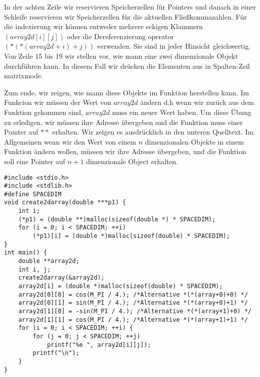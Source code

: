 In der achten Zeile wir reservieren Speicherzellen für Pointers
und danach in einer Schleife reservieren wir Speicherzellen für
die aktuellen Fließkommazahlen. Für die indexierung wir können
entweder mehrere eckigen Klammern $(array2d[i][j])$ oder
die Dereferenzierung operator $(*(*(array2d+i)+j))$ verwenden.
Sie sind in jeder Hinsicht gleichwertig. Von Zeile 15 bis 19 
wir stellen vor, wie mann eine zwei dimenzionale Objekt
durchführen kann. In diesem Fall wir 
drücken die Elementen aus in Spalten-Zeil matrixmode.

Zum ende, wir zeigen, wie mann diese Objekte im Funktion herstellen kann.
Im Funkcion wir müssen der Wert von $array2d$ ändern d.h wenn wir zurück
aus dem Funktion gekommen sind, $array2d$ muss ein neuer Wert haben.
Um diese Übung zu erledigen, wir müssen ihre Adresse übergeben und
die Funktion muss einer Pointer auf $**$ erhalten. Wir zeigen 
es ausdrücklich in den unteren Quelltext. Im Allgemeinen 
wenn wir den Wert von einem $n$ dimenzionalen Objekte in einem
Funktion ändern wollen, müssen wir ihre Adresse übergeben, und die Funktion soll
eine Pointer auf $n+1$ dimenzionale Object erhalten.
\begin{lstlisting}
#include <stdio.h>
#include <stdlib.h>
#define SPACEDIM
void create2darray(double ***p1) {
    int i;
    (*p1) = (double **)malloc(sizeof(double *) * SPACEDIM);
    for (i = 0; i < SPACEDIM; ++i)
        (*p1)[i] = (double *)malloc(sizeof(double) * SPACEDIM);
}
int main() {
    double **array2d;
    int i, j;
    create2darray(&array2d);
    array2d[i] = (double *)malloc(sizeof(double) * SPACEDIM);
    array2d[0][0] = cos(M_PI / 4.); /*Alternative *(*(array+0)+0) */
    array2d[0][1] = sin(M_PI / 4.); /*Alternative *(*(array+0)+1) */
    array2d[1][0] = -sin(M_PI / 4.); /*Alternative *(*(array+1)+0) */
    array2d[1][1] = cos(M_PI / 4.); /*Alternative *(*(array+1)+1) */
    for (i = 0; i < SPACEDIM; ++i) {
        for (j = 0; j < SPACEDIM; ++j)
            printf("%e ", array2d[i][j]);
        printf("\n");
    }
}
\end{lstlisting}
